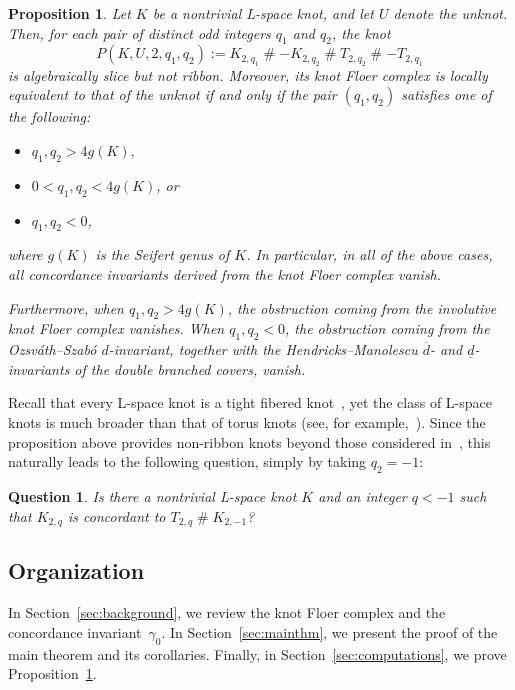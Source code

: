 \documentclass[11pt, reqno]{amsart}
\newtheorem{proposition}[theorem]{Proposition}
\newtheorem{question}[theorem]{Question}
\theoremstyle{definition}
\theoremstyle{remark}
\numberwithin{equation}{section}
\begin{document}
\begin{proposition}\label{prop:examples}
Let $K$ be a nontrivial L-space knot, and let $U$ denote the unknot. Then, for each pair of distinct odd integers $q_1$ and $q_2$, the knot
\[
P(K, U, 2, q_1, q_2) := K_{2,q_1} \mathbin{\#} -K_{2,q_2} \mathbin{\#} T_{2,q_2} \mathbin{\#} -T_{2,q_1}
\]
is algebraically slice but not ribbon. Moreover, its knot Floer complex  is locally equivalent to that of the unknot if and only if the pair $(q_1, q_2)$ satisfies one of the following:
\begin{itemize}
    \item $q_1, q_2 > 4g(K)$,
    \item $0 < q_1, q_2 < 4g(K)$, or
    \item $q_1, q_2 < 0$,
\end{itemize}
where $g(K)$ is the Seifert genus of $K$. In particular, in all of the above cases, all concordance invariants derived from the knot Floer complex vanish.


Furthermore, when $q_1, q_2 > 4g(K)$, the obstruction coming from the involutive knot Floer complex vanishes. When $q_1, q_2 < 0$, the obstruction coming from the Ozsv\'{a}th--Szab\'{o} $d$-invariant, together with the Hendricks--Manolescu $\overline{d}$- and $\underline{d}$-invariants of the double branched covers, vanish.
\end{proposition}


Recall that every L-space knot is a tight fibered knot~\cite{OS:fibered, Ghiggini:2008, Ni:2007, Hedden:2010}, yet the class of L-space knots is much broader than that of torus knots (see, for example,~\cite{OS:lensspace, Saito-Teragaito:2010}). Since the proposition above provides non-ribbon knots beyond those considered in~\cite{Miyazaki:1994, Baker:2016}, this naturally leads to the following question, simply by taking $q_2 = -1$:






\begin{question}
Is there a nontrivial L-space knot $K$ and an integer $q<-1$ such that $K_{2,q}$ is concordant to $T_{2,q} \mathbin{\#} K_{2,-1}$?
\end{question}









\subsection*{Organization}
In Section~\ref{sec:background}, we review the knot Floer complex and the concordance invariant~$\gamma_0$. In Section~\ref{sec:mainthm}, we present the proof of the main theorem and its corollaries. Finally, in Section~\ref{sec:computations}, we prove Proposition~\ref{prop:examples}.
\end{document}
